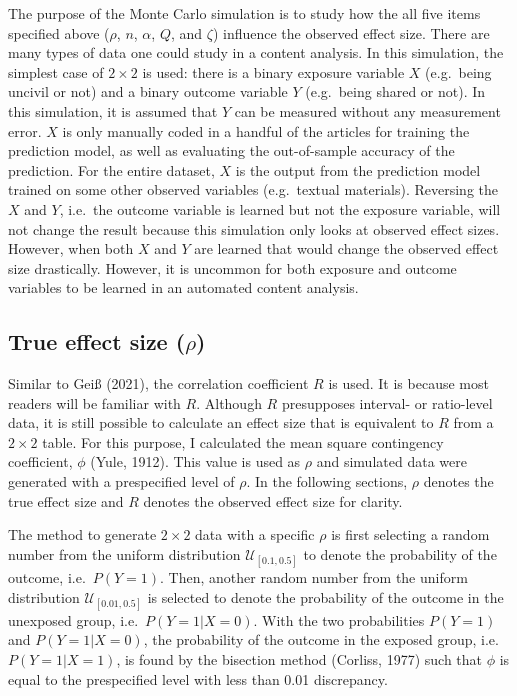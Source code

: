 \documentclass[english,man,floatsintext]{apa6}
\begin{document}
The purpose of the Monte Carlo simulation is to study how the all five items specified above (\(\rho\), \(n\), \(\alpha\), \(Q\), and \(\zeta\)) influence the observed effect size. There are many types of data one could study in a content analysis. In this simulation, the simplest case of \(2 \times 2\) is used: there is a binary exposure variable \(X\) (e.g.~being uncivil or not) and a binary outcome variable \(Y\) (e.g.~being shared or not). In this simulation, it is assumed that \(Y\) can be measured without any measurement error. \(X\) is only manually coded in a handful of the articles for training the prediction model, as well as evaluating the out-of-sample accuracy of the prediction. For the entire dataset, \(X\) is the output from the prediction model trained on some other observed variables (e.g.~textual materials). Reversing the \(X\) and \(Y\), i.e.~the outcome variable is learned but not the exposure variable, will not change the result because this simulation only looks at observed effect sizes. However, when both \(X\) and \(Y\) are learned that would change the observed effect size drastically. However, it is uncommon for both exposure and outcome variables to be learned in an automated content analysis.

\hypertarget{true-effect-size-rho}{%
\subsection{\texorpdfstring{True effect size (\(\rho\))}{True effect size (\textbackslash{}rho)}}\label{true-effect-size-rho}}

Similar to Geiß (2021), the correlation coefficient \(R\) is used. It is because most readers will be familiar with \(R\). Although \(R\) presupposes interval- or ratio-level data, it is still possible to calculate an effect size that is equivalent to \(R\) from a \(2 \times 2\) table. For this purpose, I calculated the mean square contingency coefficient, \(\phi\) (Yule, 1912). This value is used as \(\rho\) and simulated data were generated with a prespecified level of \(\rho\). In the following sections, \(\rho\) denotes the true effect size and \(R\) denotes the observed effect size for clarity.

The method to generate \(2 \times 2\) data with a specific \(\rho\) is first selecting a random number from the uniform distribution \(\mathcal{U}_{[0.1, 0.5]}\) to denote the probability of the outcome, i.e.~\(P(Y=1)\). Then, another random number from the uniform distribution \(\mathcal{U}_{[0.01, 0.5]}\) is selected to denote the probability of the outcome in the unexposed group, i.e.~\(P(Y=1|X=0)\). With the two probabilities \(P(Y=1)\) and \(P(Y=1|X=0)\), the probability of the outcome in the exposed group, i.e.~\(P(Y=1|X=1)\), is found by the bisection method (Corliss, 1977) such that \(\phi\) is equal to the prespecified level with less than 0.01 discrepancy.
\end{document}

